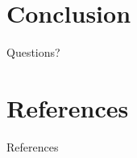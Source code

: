 \documentclass[12pt,aspectratio=916]{beamer} %
\begin{document}
\section{Conclusion}


{\BackgroundShaded
\begin{frame}
Questions?
\end{frame}
}



\section{References}

\begin{frame}{References}


\end{frame}



\end{document}
